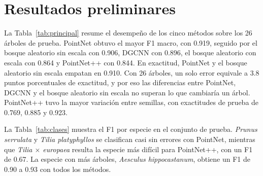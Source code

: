 \documentclass[preprint,12pt]{elsarticle}
\begin{document}
\section{Resultados preliminares}
\label{sec:resultados}

La Tabla~\ref{tab:principal} resume el desempeño de los cinco métodos sobre los 26 árboles de prueba. PointNet obtuvo el mayor F1 macro, con 0.919, seguido por el bosque aleatorio sin escala con 0.906, DGCNN con 0.896, el bosque aleatorio con escala con 0.864 y PointNet++ con 0.844. En exactitud, PointNet y el bosque aleatorio sin escala empatan en 0.910. Con 26 árboles, un solo error equivale a 3.8 puntos porcentuales de exactitud, y por eso las diferencias entre PointNet, DGCNN y el bosque aleatorio sin escala no superan lo que cambiaría un árbol. PointNet++ tuvo la mayor variación entre semillas, con exactitudes de prueba de 0.769, 0.885 y 0.923.

\begin{table}[h]
\centering
\footnotesize
{}
\caption{Resultados con media y desviación estándar muestral de tres semillas. Las métricas de prueba usan 26 árboles y las de validación 22. Los parámetros se dan en millones.}
\label{tab:principal}
\end{table}

La Tabla~\ref{tab:clases} muestra el F1 por especie en el conjunto de prueba. \textit{Prunus serrulata} y \textit{Tilia platyphyllos} se clasifican casi sin errores con PointNet, mientras que \textit{Tilia $\times$ europaea} resulta la especie más difícil para PointNet++, con un F1 de 0.67. La especie con más árboles, \textit{Aesculus hippocastanum}, obtiene un F1 de 0.90 a 0.93 con todos los métodos.

\begin{table}[h]
\centering
\footnotesize
{}
\caption{F1 por especie en el conjunto de prueba, promedio de tres semillas.}
\label{tab:clases}
\end{table}
\end{document}
